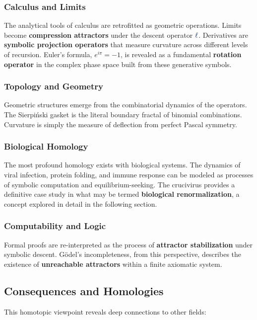 \subsubsection{Calculus and Limits}
The analytical tools of calculus are retrofitted as geometric operations. Limits become \textbf{compression attractors} under the descent operator $\lha$. Derivatives are \textbf{symbolic projection operators} that measure curvature across different levels of recursion. Euler's formula, $e^{i\pi} = -1$, is revealed as a fundamental \textbf{rotation operator} in the complex phase space built from these generative symbols.

\subsubsection{Topology and Geometry}
Geometric structures emerge from the combinatorial dynamics of the operators. The Sierpiński gasket is the literal boundary fractal of binomial combinations. Curvature is simply the measure of deflection from perfect Pascal symmetry.

\subsubsection{Biological Homology}
The most profound homology exists with biological systems. The dynamics of viral infection, protein folding, and immune response can be modeled as processes of symbolic computation and equilibrium-seeking. The crucivirus provides a definitive case study in what may be termed \textbf{biological renormalization}, a concept explored in detail in the following section.

\subsubsection{Computability and Logic}
Formal proofs are re-interpreted as the process of \textbf{attractor stabilization} under symbolic descent. Gödel's incompleteness, from this perspective, describes the existence of \textbf{unreachable attractors} within a finite axiomatic system.

\subsection{Consequences and Homologies}
This homotopic viewpoint reveals deep connections to other fields:

